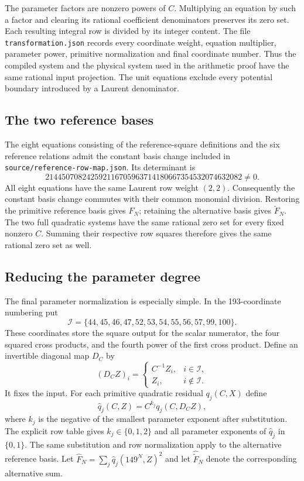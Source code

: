 \documentclass[11pt,a4paper]{article}
\begin{document}
The parameter factors are nonzero powers of $C$. Multiplying an equation
by such a factor and clearing its rational coefficient denominators
preserves its zero set. Each resulting integral row is divided by its
integer content. The file \nolinkurl{transformation.json} records every
coordinate weight, equation multiplier, parameter power, primitive
normalization and final coordinate number. Thus the compiled system and
the physical system used in the arithmetic proof have the same rational
input projection. The unit equations exclude every potential boundary
introduced by a Laurent denominator.

\subsection{The two reference bases}
The eight equations consisting of the reference-square definitions and
the six reference relations admit the constant basis change included in
\nolinkurl{source/reference-row-map.json}. Its determinant is
\[
             214450708242592116705963714180667354532074632082\ne0.
\]
All eight equations have the same Laurent row weight $(2,2)$.
Consequently the constant basis change commutes with their common
monomial division. Restoring the primitive reference basis gives
$F_N$; retaining the alternative basis gives $\widetilde F_N$.
The two full quadratic systems have the same rational zero set for every
fixed nonzero $C$. Summing their respective row squares therefore gives
the same rational zero set as well.

\subsection{Reducing the parameter degree}
The final parameter normalization is especially simple. In the
193-coordinate numbering put
\[
 \mathcal I=\{44,45,46,47,52,53,54,55,56,57,99,100\}.
\]
These coordinates store the square output for the scalar numerator,
the four squared cross products, and the fourth power of the first
cross product. Define an invertible diagonal map $D_C$ by
\[
 (D_C Z)_i=\begin{cases} C^{-1}Z_i,&i\in\mathcal I,\\
 Z_i,&i\notin\mathcal I.\end{cases}
\]
It fixes the input. For each primitive quadratic residual $q_j(C,X)$
define
\[
 \widehat q_j(C,Z)=C^{k_j}q_j(C,D_CZ),
\]
where $k_j$ is the negative of the smallest parameter exponent after
substitution. The explicit row table gives $k_j\in\{0,1,2\}$ and
all parameter exponents of $\widehat q_j$ in $\{0,1\}$. The same
substitution and row normalization apply to the alternative reference
basis. Let $\widehat F_N=\sum_j\widehat q_j(149^N,Z)^2$ and let
$\widehat{\widetilde F}_N$ denote the corresponding alternative sum.
\end{document}
